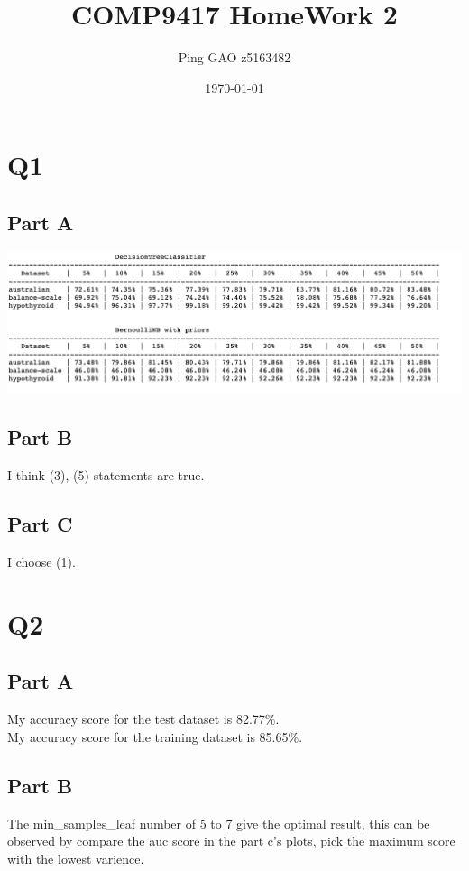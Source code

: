 \documentclass[12pt]{article}
\title{COMP9417 HomeWork 2}
\author{Ping GAO z5163482}
\date{\today}
\begin{document}
    \maketitle
    \section{Q1}\label{sec:q1}
    \subsection{Part A}\label{subsec:part-a}
    \includegraphics[scale=0.18]{result.jpeg}
    \subsection{Part B}\label{subsec:part-b}
    I think (3), (5) statements are true.
    \subsection{Part C}\label{subsec:part-c}
    I choose (1).
    \section{Q2}\label{sec:q2}
    \subsection{Part A}\label{subsec:part-a2}
    My accuracy score for the test dataset is 82.77\%. \\
    My accuracy score for the training dataset is 85.65\%.
    \subsection{Part B}\label{subsec:part-b2}
    The min\_samples\_leaf number of 5 to 7 give the optimal
    result, this can be observed by compare the auc score in
    the part c's plots, pick the maximum score with the lowest varience.
\end{document}
